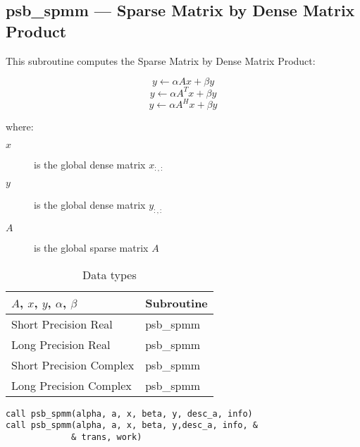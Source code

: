 %
%


\clearpage\subsection*{psb\_spmm --- Sparse Matrix by Dense Matrix
  Product}

This subroutine computes the Sparse Matrix by Dense Matrix Product:

\begin{equation}
y \leftarrow \alpha  A  x + \beta y
\label{eq:f90spmm_no_tra}
\end{equation}
\begin{equation}
y \leftarrow \alpha  A^T x + \beta y
\label{eq:f90spmm_tra}
\end{equation}
\begin{equation}
y \leftarrow \alpha  A^H  x + \beta y
\label{eq:f90spmm_con}
\end{equation}

where:
\begin{description}
\item[$x$] is the global dense matrix $x_{:, :}$
\item[$y$] is the global dense matrix $y_{:, :}$
\item[$A$] is the global sparse matrix $A$
\end{description}

\begin{table}[h]
\begin{center}
\begin{tabular}{ll}
\hline
$A$, $x$, $y$, $\alpha$, $\beta$ & {\bf Subroutine}\\
\hline
Short Precision Real & psb\_spmm \\
Long Precision Real & psb\_spmm \\
Short Precision Complex & psb\_spmm \\
Long Precision Complex & psb\_spmm \\
\hline
\end{tabular}
\end{center}
\caption{Data types\label{tab:f90spmm}}
\end{table}

\begin{verbatim}
call psb_spmm(alpha, a, x, beta, y, desc_a, info)
call psb_spmm(alpha, a, x, beta, y,desc_a, info, &
             & trans, work)
\end{verbatim} 

